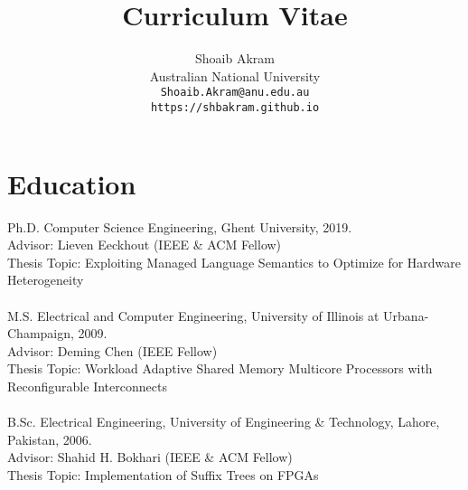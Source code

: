 \documentclass[singlecolumn,singlespace,11pt]{article}
\begin{document}
\title{ { \bfseries Curriculum Vitae} }
\author{Shoaib Akram\\
	Australian National University \\
        \texttt{Shoaib.Akram@anu.edu.au} \\
        \texttt{https://shbakram.github.io}
       }
\date{}
\maketitle

\section*{Education}
\noindent Ph.D. Computer Science Engineering, Ghent University, 2019. \\
Advisor: Lieven Eeckhout (IEEE \& ACM Fellow)  \\
Thesis Topic: Exploiting Managed Language Semantics to Optimize for Hardware Heterogeneity
\\
\\
\noindent M.S. Electrical and Computer Engineering, University of Illinois at Urbana-Champaign, 2009. \\
Advisor: Deming Chen (IEEE Fellow) \\
Thesis Topic: Workload Adaptive Shared Memory Multicore Processors with Reconfigurable Interconnects
\\
\\
\noindent B.Sc. Electrical Engineering, University of Engineering \& Technology, Lahore, Pakistan, 2006.\\
Advisor: Shahid H. Bokhari (IEEE \& ACM Fellow) \\
Thesis Topic: Implementation of Suffix Trees on FPGAs 
\end{document}

